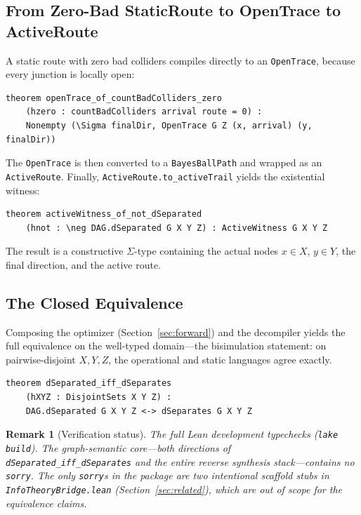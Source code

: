 \documentclass[acmsmall,screen,nonacm]{acmart}
\newtheorem{remark}{Remark}
\newcommand{\lean}[1]{\lstinline!#1!}
\begin{document}
\subsection{From Zero-Bad StaticRoute to OpenTrace to ActiveRoute}

A static route with zero bad colliders compiles directly to an \lean{OpenTrace},
because every junction is locally open:

\begin{lstlisting}[caption={Zero-bad compiler}]
theorem openTrace_of_countBadColliders_zero
    (hzero : countBadColliders arrival route = 0) :
    Nonempty (\Sigma finalDir, OpenTrace G Z (x, arrival) (y, finalDir))
\end{lstlisting}

The \lean{OpenTrace} is then converted to a \lean{BayesBallPath} and wrapped as
an \lean{ActiveRoute}.  Finally, \lean{ActiveRoute.to_activeTrail} yields the
existential witness:

\begin{lstlisting}[caption={Final decompiler theorem}]
theorem activeWitness_of_not_dSeparated
    (hnot : \neg DAG.dSeparated G X Y Z) : ActiveWitness G X Y Z
\end{lstlisting}

The result is a constructive $\Sigma$-type containing the actual nodes $x \in X$,
$y \in Y$, the final direction, and the active route.

\subsection{The Closed Equivalence}

Composing the optimizer (Section~\ref{sec:forward}) and the decompiler yields
the full equivalence on the well-typed domain---the bisimulation
statement: on pairwise-disjoint $X,Y,Z$, the operational and static languages
agree exactly.

\begin{lstlisting}[caption={Full d-separation equivalence (no proof debt)}]
theorem dSeparated_iff_dSeparates
    (hXYZ : DisjointSets X Y Z) :
    DAG.dSeparated G X Y Z <-> dSeparates G X Y Z
\end{lstlisting}

\begin{remark}[Verification status]\label{rem:status}
The full Lean development typechecks (\lean{lake build}).  The graph-semantic
core---both directions of \lean{dSeparated_iff_dSeparates} and the entire
reverse synthesis stack---contains no \lean{sorry}.  The only \lean{sorry}s in
the package are two \emph{intentional} scaffold stubs in
\lean{InfoTheoryBridge.lean} (Section~\ref{sec:related}), which are out of
scope for the equivalence claims.
\end{remark}
\end{document}
